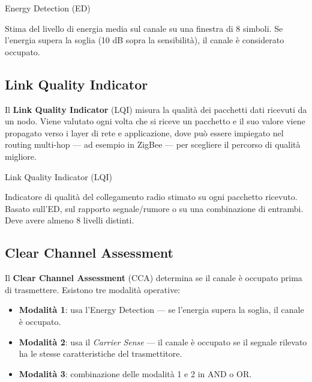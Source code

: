 \documentclass[
  italian,
  openany]{book}
\providecommand{\tightlist}{%
  \setlength{\itemsep}{0pt}\setlength{\parskip}{0pt}}
\begin{document}
\begin{calloutdefinition}{Energy Detection (ED)}

Stima del livello di energia media sul canale su una finestra di 8
simboli. Se l'energia supera la soglia (10 dB sopra la sensibilità), il
canale è considerato occupato.

\end{calloutdefinition}

\subsection{Link Quality Indicator}\label{link-quality-indicator}

Il \textbf{Link Quality Indicator} (LQI) misura la qualità dei pacchetti
dati ricevuti da un nodo. Viene valutato ogni volta che si riceve un
pacchetto e il suo valore viene propagato verso i layer di rete e
applicazione, dove può essere impiegato nel routing multi-hop --- ad
esempio in ZigBee --- per scegliere il percorso di qualità migliore.

\begin{calloutdefinition}{Link Quality Indicator (LQI)}

Indicatore di qualità del collegamento radio stimato su ogni pacchetto
ricevuto. Basato sull'ED, sul rapporto segnale/rumore o su una
combinazione di entrambi. Deve avere almeno 8 livelli distinti.

\end{calloutdefinition}

\subsection{Clear Channel Assessment}\label{clear-channel-assessment}

Il \textbf{Clear Channel Assessment} (CCA) determina se il canale è
occupato prima di trasmettere. Esistono tre modalità operative:

\begin{itemize}
\tightlist
\item
  \textbf{Modalità 1}: usa l'Energy Detection --- se l'energia supera la
  soglia, il canale è occupato.
\item
  \textbf{Modalità 2}: usa il \emph{Carrier Sense} --- il canale è
  occupato se il segnale rilevato ha le stesse caratteristiche del
  trasmettitore.
\item
  \textbf{Modalità 3}: combinazione delle modalità 1 e 2 in AND o OR.
\end{itemize}
\end{document}

